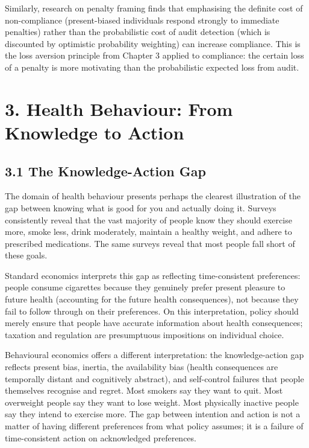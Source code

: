 \documentclass[12pt, letterpaper]{article}
\begin{document}
Similarly, research on penalty framing finds that emphasising the definite cost of non-compliance (present-biased individuals respond strongly to immediate penalties) rather than the probabilistic cost of audit detection (which is discounted by optimistic probability weighting) can increase compliance. This is the loss aversion principle from Chapter 3 applied to compliance: the certain loss of a penalty is more motivating than the probabilistic expected loss from audit.

\medskip


\section{3. Health Behaviour: From Knowledge to Action}



\subsection{3.1 The Knowledge-Action Gap}


The domain of health behaviour presents perhaps the clearest illustration of the gap between knowing what is good for you and actually doing it. Surveys consistently reveal that the vast majority of people know they should exercise more, smoke less, drink moderately, maintain a healthy weight, and adhere to prescribed medications. The same surveys reveal that most people fall short of these goals.

Standard economics interprets this gap as reflecting time-consistent preferences: people consume cigarettes because they genuinely prefer present pleasure to future health (accounting for the future health consequences), not because they fail to follow through on their preferences. On this interpretation, policy should merely ensure that people have accurate information about health consequences; taxation and regulation are presumptuous impositions on individual choice.

Behavioural economics offers a different interpretation: the knowledge-action gap reflects present bias, inertia, the availability bias (health consequences are temporally distant and cognitively abstract), and self-control failures that people themselves recognise and regret. Most smokers say they want to quit. Most overweight people say they want to lose weight. Most physically inactive people say they intend to exercise more. The gap between intention and action is not a matter of having different preferences from what policy assumes; it is a failure of time-consistent action on acknowledged preferences.
\end{document}
